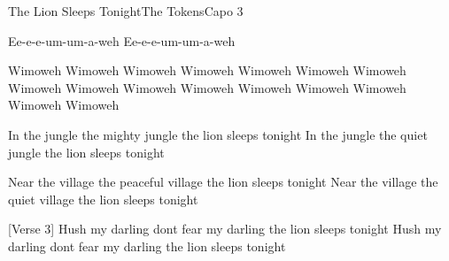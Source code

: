 \begin{song}{The Lion Sleeps Tonight}{The Tokens}{Capo 3}

Ee-e-e-um-um-a-weh
Ee-e-e-um-um-a-weh

Wimoweh Wimoweh Wimoweh Wimoweh
Wimoweh Wimoweh Wimoweh Wimoweh
Wimoweh Wimoweh Wimoweh Wimoweh
Wimoweh Wimoweh Wimoweh Wimoweh

In the jungle the mighty jungle
the lion sleeps tonight
In the jungle the quiet jungle
the lion sleeps tonight


Near the village the peaceful village
the lion sleeps tonight
Near the village the quiet village
the lion sleeps tonight


[Verse 3]
Hush my darling dont fear my darling
the lion sleeps tonight
Hush my darling dont fear my darling
the lion sleeps tonight


\end{song}

